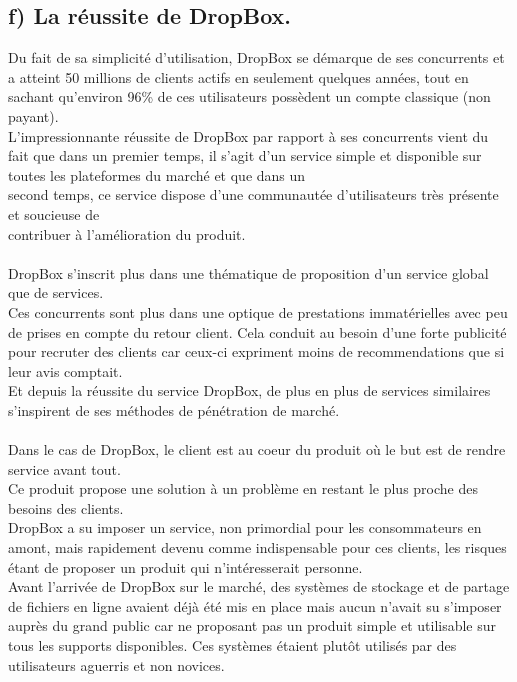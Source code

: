 \documentclass[a4paper, 10pt]{article}
\begin{document}
\subsection*{f) La réussite de DropBox.}
Du fait de sa simplicité d'utilisation, DropBox se démarque de ses concurrents et
a atteint 50 millions de clients actifs en seulement quelques années,
tout en sachant qu'environ 96\% de ces utilisateurs possèdent un compte classique (non payant).\\
L'impressionnante réussite de DropBox par rapport à ses concurrents vient du fait que dans un premier temps,
il s'agit d'un service simple et disponible sur toutes les plateformes du marché et
que dans un\\second temps, ce service dispose d'une communautée d'utilisateurs très présente et soucieuse
de\\contribuer à l'amélioration du produit.\\ \\
DropBox s'inscrit plus dans une thématique de proposition d'un service global que de services.\\
Ces concurrents sont plus dans une optique de prestations immatérielles avec peu de prises en compte du retour client.
Cela conduit au besoin d'une forte publicité pour recruter des clients
car ceux-ci expriment moins de recommendations que si leur avis comptait.\\
Et depuis la réussite du service DropBox, de plus en plus de services similaires s'inspirent de ses méthodes de pénétration de marché.\\ \\
Dans le cas de DropBox, le client est au coeur du produit où le but est de rendre service avant tout.\\
Ce produit propose une solution à un problème en restant le plus proche des besoins des clients.\\
DropBox a su imposer un service, non primordial pour les consommateurs en amont,
mais rapidement devenu comme indispensable pour ces clients, les risques étant de proposer un produit qui n'intéresserait personne.\\
Avant l'arrivée de DropBox sur le marché, des systèmes de stockage et de partage de fichiers en ligne avaient déjà été mis en place
mais aucun n'avait su s'imposer auprès du grand public car ne proposant pas un produit simple et utilisable sur tous les supports disponibles.
Ces systèmes étaient plutôt utilisés par des utilisateurs aguerris et non novices.\\ \\
\end{document}
